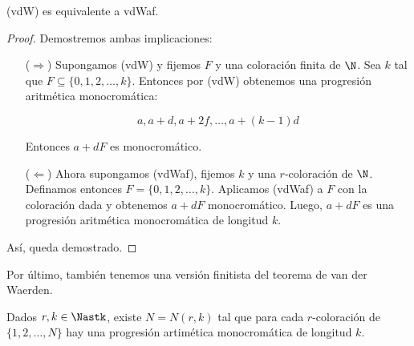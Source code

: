 \begin{teo}
    (vdW) es equivalente a vdWaf.
\end{teo}

\begin{proof}
    Demostremos ambas implicaciones:
    
    \begin{itemize}
        \item[($\Rightarrow$)] Supongamos (vdW) y fijemos $F$ y una coloración finita de $\N$. Sea $k$ tal que $F \subseteq \{0, 1, 2, \dots, k\}$. Entonces por (vdW) obtenemos una progresión aritmética monocromática:
        
        \[
        a, a+d, a+2f, \dots, a+(k-1)d
        \]
        
        Entonces $a+dF$ es monocromático.
        
        \item[($\Leftarrow$)] Ahora supongamos (vdWaf), fijemos $k$ y una $r$-coloración de $\N$. Definamos entonces $F = \{0, 1, 2, \dots, k\}$. Aplicamos (vdWaf) a $F$ con la coloración dada y obtenemos $a+dF$ monocromático. Luego, $a + dF$ es una progresión aritmética monocromática de longitud $k$.
    \end{itemize}
    
    Así, queda demostrado.
\end{proof}

Por último, también tenemos una versión finitista del teorema de van der Waerden.

\begin{teo}[vdWfin]
    Dados $r, k \in \Nastk$, existe $N = N(r,k)$ tal que para cada $r$-coloración de $\{ 1, 2, \dots, N \}$ hay una progresión artimética monocromática de longitud $k$.
\end{teo}

